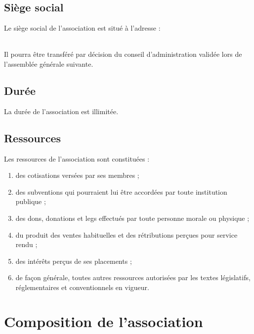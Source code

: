 \documentclass[12pt, a4paper]{article}
\begin{document}
\subsection{Siège social}

Le siège social de l’association est situé à l’adresse :

\vspace{.5cm}
\vspace{.5cm}\\
Il pourra être transféré par décision du conseil d’administration validée lors de l’assemblée générale suivante.

\subsection{Durée}

La durée de l’association est illimitée.

\subsection{Ressources}

Les ressources de l’association sont constituées :

\begin{enumerate}
    \item des cotisations versées par ses membres ;
    \item des subventions qui pourraient lui être accordées par toute institution publique ;
    \item des dons, donations et legs effectués par toute personne morale ou physique ;
    \item du produit des ventes habituelles et des rétributions perçues pour service rendu ;
    \item des intérêts perçus de ses placements ;
    \item de façon générale, toutes autres ressources autorisées par les textes législatifs, réglementaires et conventionnels en vigueur.
\end{enumerate}

\section{Composition de l’association}
\end{document}
